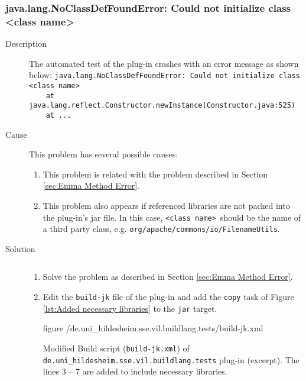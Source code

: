 \subsubsection[java.lang.NoClassDefFoundError]{java.lang.NoClassDefFoundError: Could not initialize class <class name>}
\label{sec:NoClassDefFoundError}
\begin{description}
	\item[Description] $ $\\
		The automated test of the plug-in crashes with an error message as shown below:
		\small
			\verb|java.lang.NoClassDefFoundError: Could not initialize class |\color{red}\verb|<class name>|\\
			\color{black}\verb|    at java.lang.reflect.Constructor.newInstance(Constructor.java:525)|\\
			\verb|    at ...|
		\normalsize
	\item[Cause] $ $\\
	This problem has several possible causes:	
	\begin{enumerate}
		\item This problem is related with the problem described in Section \vref{sec:Emma Method Error}.
		\item This problem also appears if referenced libraries are not packed into the plug-in's jar file. In this case, \color{red}\texttt{<class name>}\color{black}\ should be the name of a third party class, e.g. \texttt{org/apache/commons/io/FilenameUtils}.
	\end{enumerate}
	\item[Solution] $ $
	\begin{enumerate}
		\item Solve the problem as described in Section \ref{sec:Emma Method Error}.
		\item Edit the \texttt{build-jk} file of the plug-in and add the \texttt{copy} task of Figure \vref{lst:Added necessary libraries} to the \texttt{jar} target.
		\begin{nofloat}{figure}
			\centering
			 {\InstantiationHome/de.uni_hildesheim.sse.vil.buildlang.tests/build-jk.xml}
			\caption[Creation of a jar, including referenced libraries]{Modified Build script (\texttt{build-jk.xml}) of \texttt{de.uni\_hildesheim.sse.vil.build\-lang.tests} plug-in (excerpt). The lines 3 -- 7 are added to include necessary libraries.}
			\label{lst:Added necessary libraries}
\end{nofloat}
	\end{enumerate}
\end{description}

